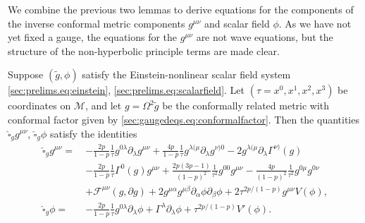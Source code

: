 \documentclass{article}
\newcommand{\mc}{\mathcal}
\newcommand{\wh}{\widehat}
\newcommand{\wt}{\widetilde}
\newcommand{\pa}{\partial}
\begin{document}
\smallskip
We combine the previous two lemmas to derive equations for the components of the inverse conformal metric components $g^{\mu\nu}$ and scalar field $\phi$. As we have not yet fixed a gauge, the equations for the $g^{\mu\nu}$ are not wave equations, but the structure of the non-hyperbolic principle terms are made clear.
\begin{lemma}\label{sec:gaugedeqs.prop:confwave}
    Suppose $(\wt{g},\phi)$ satisfy the Einstein-nonlinear scalar field system \eqref{sec:prelims.eq:einstein}, \eqref{sec:prelims.eq:scalarfield}. Let $(\tau = x^0,x^1,x^2,x^3)$ be coordinates on $\mc{M}$, and let $g = \Omega^2\wt{g}$ be the conformally related metric with conformal factor given by \eqref{sec:gaugedeqs.eq:conformalfactor}. Then the quantities $\wh{\square}_g g^{\mu\nu}$, $\wh{\square}_g \phi$ satisfy the identities
    \begin{subequations}
        \begin{align}
            \wh{\square}_g g^{\mu\nu} =\>& -\frac{2p}{1-p}\frac{1}{\tau}g^{0\lambda}\pa_\lambda g^{\mu\nu} + \frac{4p}{1-p}\frac{1}{\tau}g^{\lambda(\mu}\pa_\lambda g^{\nu)0} - 2g^{\lambda(\mu}\pa_\lambda \Gamma^{\nu)}(g)\nonumber\\
            &-\frac{2p}{1-p}\frac{1}{\tau}\Gamma^0(g)g^{\mu\nu} +  \frac{2p(3p-1)}{(1-p)^2}\frac{1}{\tau^2}g^{00}g^{\mu\nu} - \frac{4p}{(1-p)^2}\frac{1}{\tau^2}g^{0\mu}g^{0\nu}\nonumber\\
            &+ \mc{F}^{\mu\nu}(g,\pa g) + 2g^{\mu\alpha}g^{\mu\beta}\pa_\alpha\phi\pa_\beta\phi + 2\tau^{2p/(1-p)}g^{\mu\nu}V(\phi),\label{sec:gaugedeqs.eq:confmet1}\\
            \wh{\square}_g\phi =&-\frac{2p}{1-p}\frac{1}{\tau}g^{0\lambda}\pa_\lambda \phi + \Gamma^\lambda \pa_\lambda\phi+ \tau^{2p/(1-p)}V'(\phi).\label{sec:gaugedeqs.eq:confsf1}
        \end{align}
    \end{subequations}
\end{lemma}
\end{document}
